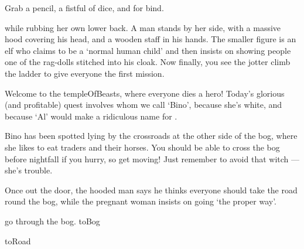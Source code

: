\documentclass[10pt,twoside]{book}
\begin{document}

\noindent
Grab a pencil, a fistful of dice, and  for \gls{bind}.

\pagebreak
\pagestyle{minizine}

while rubbing her own lower back.
A man stands by her side, with a massive hood covering his head, and a wooden staff in his hands.
The smaller figure is an elf who claims to be a `normal human child' and then insists on showing people one of the rag-dolls stitched into his cloak.
Now finally, you see the \gls{jotter} climb the ladder to give everyone the first mission.

\begin{speechtext}
  Welcome to the \gls{templeOfBeasts}, where everyone dies a hero!
  Today's glorious (and profitable) quest involves  whom we call `Bino', because she's white, and because `Al' would make a ridiculous name for .

  Bino has been spotted lying by the crossroads at the other side of the bog, where she likes to eat traders and their horses.
  You should be able to cross the bog before nightfall if you hurry, so get moving!
  Just remember to avoid that \gls{witch} --- she's trouble.
\end{speechtext}

Once out the door, the hooded man says he thinks everyone should take the road round the bog, while the pregnant woman insists on going `the proper way'.

\begin{selectPath}
  {go through the bog.}%
  {toBog}

  {}%
  {toRoad}
\end{selectPath}
\end{document}
